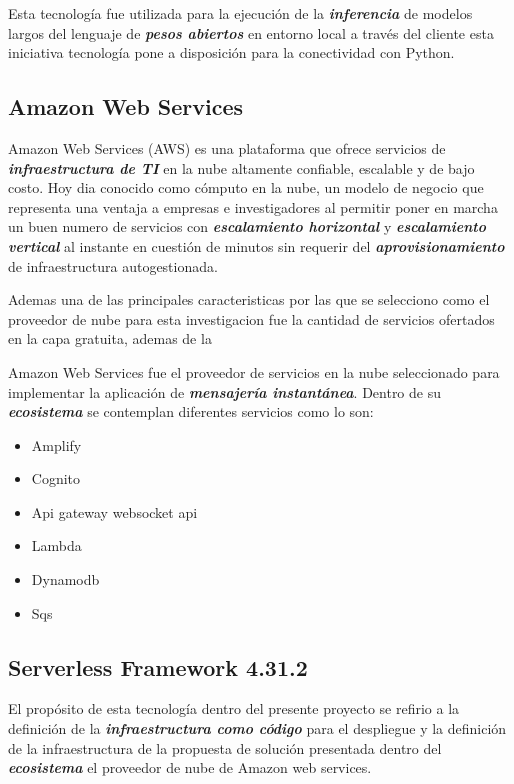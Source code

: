 Esta tecnología fue utilizada para la ejecución de la \textbf{\textit{inferencia}} de modelos largos del lenguaje de \textbf{\textit{pesos abiertos}} en entorno local a través del cliente esta iniciativa tecnología pone a disposición para la conectividad con Python.

\subsection{Amazon Web Services}   

Amazon Web Services (AWS) es una plataforma que ofrece servicios de \textbf{\textit{infraestructura de TI}} en la nube altamente confiable, escalable y de bajo costo. Hoy dia conocido como cómputo en la nube, un modelo de negocio que representa una ventaja a empresas e investigadores al permitir poner en marcha un buen numero de servicios con \textbf{\textit{escalamiento horizontal}} y \textbf{\textit{escalamiento vertical}} al instante en cuestión de minutos sin requerir del \textbf{\textit{aprovisionamiento}} de infraestructura autogestionada. \cite{WhatIsAws}

Ademas una de las principales caracteristicas por las que se selecciono como el proveedor de nube para esta investigacion fue la cantidad de servicios ofertados en la capa gratuita, ademas de la 

Amazon Web Services fue el proveedor de servicios en la nube seleccionado para implementar la aplicación de \textbf{\textit{mensajería instantánea}}. Dentro de su \textbf{\textit{ecosistema}} se contemplan diferentes servicios como lo son:

\begin{itemize}
    \item Amplify
    \item Cognito
    \item Api gateway websocket api
    \item Lambda
    \item Dynamodb
    \item Sqs
\end{itemize}

\subsection{Serverless Framework 4.31.2}

El propósito de esta tecnología dentro del presente proyecto se refirio a la definición de la \textbf{\textit{infraestructura como código}} para el despliegue y la definición de la infraestructura de la propuesta de solución presentada dentro del \textbf{\textit{ecosistema}} el proveedor de nube de Amazon web services. \cite{WhatIsSLS}

